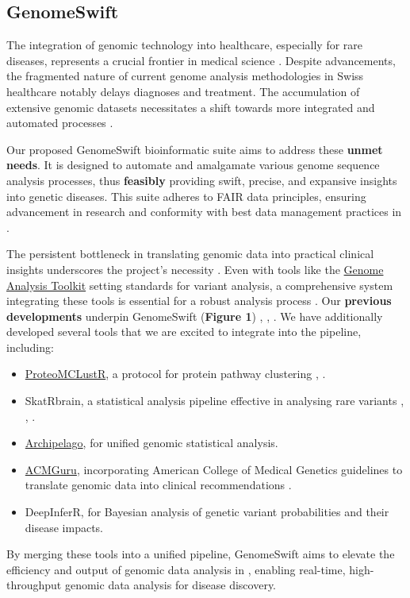 \subsection{GenomeSwift}\label{GenomeSwift}

The integration of genomic technology into healthcare, especially for
rare diseases, represents a crucial frontier in medical science \citep{ref1}.
Despite advancements, the fragmented nature of current genome analysis
methodologies in Swiss healthcare notably delays diagnoses and
treatment. The accumulation of extensive genomic datasets necessitates a
shift towards more integrated and automated processes \citep{ref2}.

Our proposed GenomeSwift bioinformatic suite aims to address these
\textbf{unmet needs}. It is designed to automate and amalgamate various
genome sequence analysis processes, thus \textbf{feasibly} providing
swift, precise, and expansive insights into genetic diseases. This suite
adheres to FAIR data principles, ensuring advancement in research and
conformity with best data management practices in \kispi.

The persistent bottleneck in translating genomic data into practical
clinical insights underscores the project's necessity
\citep{ref3}. Even with tools like the
\href{https://gatk.broadinstitute.org/hc/en-us}{Genome Analysis Toolkit}
setting standards for variant analysis, a comprehensive system
integrating these tools is essential for a robust analysis process
\citep{ref4}. Our \textbf{previous developments} underpin GenomeSwift
(\textbf{Figure 1}) \citep{ref5}, \citep{ref6}, \citep{ref7}. We have additionally
developed several tools that we are excited to integrate into the
pipeline, including:

\begin{itemize}
\item
  \href{https://github.com/DylanLawless/ProteoMCLustR}{ProteoMCLustR}, a
  protocol for protein pathway clustering \citep{ref8}, \citep{ref7}.
\item
  SkatRbrain, a statistical analysis pipeline effective in analysing
  rare variants \citep{ref9}, \citep{ref10}, \citep{ref11}.
\item
  \href{https://github.com/DylanLawless/archipelago}{Archipelago}, for
  unified genomic statistical analysis.
\item
  \href{https://github.com/DylanLawless/ACMGuru}{ACMGuru}, incorporating
  American College of Medical Genetics guidelines to translate genomic
  data into clinical recommendations \citep{ref12}.
\item
  DeepInferR, for Bayesian analysis of genetic variant probabilities and
  their disease impacts.
\end{itemize}

By merging these tools into a unified pipeline, GenomeSwift aims to
elevate the efficiency and output of genomic data analysis in \kispi,
enabling real-time, high-throughput genomic data analysis for disease
discovery.

